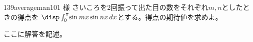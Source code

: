 \begin{prob}{139}{}{averageman101 様}
 さいころを2回振って出た目の数をそれぞれ$m, n$としたときの得点を $\disp \int_0^\pi\! \sin mx \sin nx \,dx$とする。得点の期待値を求めよ。
\end{prob}
ここに解答を記述。